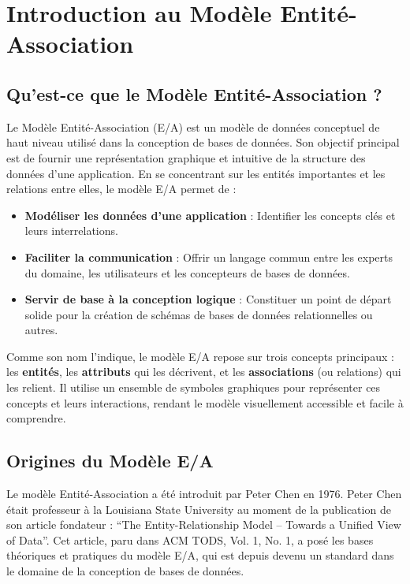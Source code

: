 \documentclass{article}
\begin{document}
\sloppy

\section{Introduction au Modèle Entité-Association}

\subsection{Qu'est-ce que le Modèle Entité-Association ?}

Le Modèle Entité-Association (E/A) est un modèle de données conceptuel de haut niveau utilisé dans la conception de bases de données. Son objectif principal est de fournir une représentation graphique et intuitive de la structure des données d'une application. En se concentrant sur les entités importantes et les relations entre elles, le modèle E/A permet de :

\begin{itemize}
    \item \textbf{Modéliser les données d'une application} : Identifier les concepts clés et leurs interrelations.
    \item \textbf{Faciliter la communication} : Offrir un langage commun entre les experts du domaine, les utilisateurs et les concepteurs de bases de données.
    \item \textbf{Servir de base à la conception logique} :  Constituer un point de départ solide pour la création de schémas de bases de données relationnelles ou autres.
\end{itemize}

Comme son nom l'indique, le modèle E/A repose sur trois concepts principaux : les \textbf{entités}, les \textbf{attributs} qui les décrivent, et les \textbf{associations} (ou relations) qui les relient.  Il utilise un ensemble de symboles graphiques pour représenter ces concepts et leurs interactions, rendant le modèle visuellement accessible et facile à comprendre.

\subsection{Origines du Modèle E/A}

Le modèle Entité-Association a été introduit par Peter Chen en 1976. Peter Chen était professeur à la Louisiana State University au moment de la publication de son article fondateur :  ``The Entity-Relationship Model -- Towards a Unified View of Data''. Cet article, paru dans ACM TODS, Vol. 1, No. 1, a posé les bases théoriques et pratiques du modèle E/A, qui est depuis devenu un standard dans le domaine de la conception de bases de données.
\end{document}
